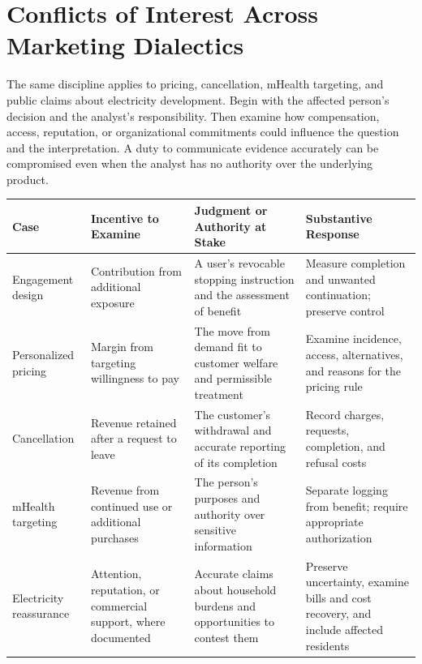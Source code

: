 
\hypertarget{M09-conflicts-of-interest-across-marketing-dialectics}{%
\section{Conflicts of Interest Across Marketing
Dialectics}\label{M09-conflicts-of-interest-across-marketing-dialectics}}

\noindent \noindent The same discipline applies to pricing, cancellation, mHealth
targeting, and public claims about electricity development. Begin with
the affected person's decision and the analyst's responsibility. Then
examine how compensation, access, reputation, or organizational
commitments could influence the question and the interpretation. A duty
to communicate evidence accurately can be compromised even when the
analyst has no authority over the underlying product.

\begin{table}[H]
\centering\small
\begin{tabular}{@{}
  >{\raggedright\arraybackslash}p{}
  >{\raggedright\arraybackslash}p{}
  >{\raggedright\arraybackslash}p{}
  >{\raggedright\arraybackslash}p{}@{}}
\toprule
Case & Incentive to Examine & Judgment or Authority at Stake &
Substantive Response \\
\midrule

Engagement design & Contribution from additional exposure & A user's
revocable stopping instruction and the assessment of benefit & Measure
completion and unwanted continuation; preserve control \\
Personalized pricing & Margin from targeting willingness to pay & The
move from demand fit to customer welfare and permissible treatment &
Examine incidence, access, alternatives, and reasons for the pricing
rule \\
Cancellation & Revenue retained after a request to leave & The
customer's withdrawal and accurate reporting of its completion & Record
charges, requests, completion, and refusal costs \\
mHealth targeting & Revenue from continued use or additional purchases &
The person's purposes and authority over sensitive information &
Separate logging from benefit; require appropriate authorization \\
Electricity reassurance & Attention, reputation, or commercial support,
where documented & Accurate claims about household burdens and
opportunities to contest them & Preserve uncertainty, examine bills and
cost recovery, and include affected residents \\
\bottomrule
\end{tabular}
\end{table}

